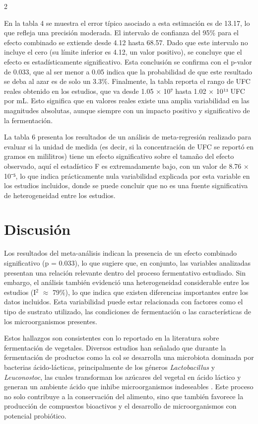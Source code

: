 \begin{multicols}{2}
    
En la tabla 4 se muestra el error típico asociado a esta estimación es de 13.17, lo que refleja una precisión moderada. El intervalo de confianza del 95\% para el efecto combinado se extiende desde 4.12 hasta 68.57. Dado que este intervalo no incluye el cero (su límite inferior es 4.12, un valor positivo), se concluye que el efecto es estadísticamente significativo. Esta conclusión se confirma con el p-valor de 0.033, que al ser menor a 0.05 indica que la probabilidad de que este resultado se deba al azar es de solo un 3.3\%. Finalmente, la tabla reporta el rango de UFC reales obtenido en los estudios, que va desde 1.05 × 10⁷ hasta 1.02 × 10¹³ UFC por mL. Esto significa que en valores reales  existe una  amplia variabilidad en las magnitudes absolutas, aunque siempre con un impacto positivo y significativo de la fermentación. 

    
La tabla 6 presenta los resultados de un análisis de meta-regresión realizado para evaluar si la unidad de medida (es decir, si la concentración de UFC se reportó en gramos  en mililitros) tiene un efecto significativo sobre el tamaño del efecto observado, aquí  el estadístico F es extremadamente bajo, con un valor de 8.76 × 10⁻⁵, lo que indica prácticamente nula variabilidad explicada por esta variable en los estudios incluidos, donde se puede concluir que no es una fuente significativa de heterogeneidad entre los estudios.
    
    


\section{Discusión}

Los resultados del meta-análisis indican la presencia de un efecto combinado significativo  (p = 0.033), lo que sugiere que, en conjunto, las variables analizadas presentan una relación relevante dentro del proceso fermentativo estudiado. Sin embargo, el análisis también evidenció una heterogeneidad considerable entre los estudios (I$^{2}$ $\approx$ 79\%), lo que indica que existen diferencias importantes entre los datos incluidos. Esta variabilidad puede estar relacionada con factores como el tipo de sustrato utilizado, las condiciones de fermentación o las características de los microorganismos presentes.

Estos hallazgos son consistentes con lo reportado en la literatura sobre fermentación de vegetales. Diversos estudios han señalado que durante la fermentación de productos como la col se desarrolla una microbiota dominada por bacterias ácido-lácticas, principalmente de los géneros \textit{Lactobacillus} y \textit{Leuconostoc}, las cuales transforman los azúcares del vegetal en ácido láctico y generan un ambiente ácido que inhibe microorganismos indeseables \citep{dicagno2013, touret2018}. Este proceso no solo contribuye a la conservación del alimento, sino que también favorece la producción de compuestos bioactivos y el desarrollo de microorganismos con potencial probiótico.


\end{multicols}
